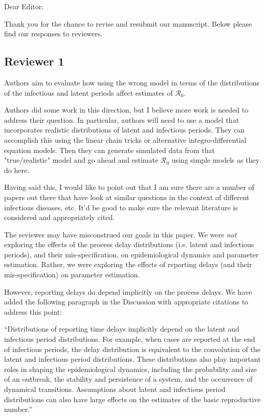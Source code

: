 \documentclass[12pt]{article}
\newcommand{\rev}{\subsection*}
\newcommand{\revtext}{\textsf}
\begin{document}
\noindent Dear Editor:

Thank you for the chance to revise and resubmit our manuscript. 
Below please find our responses to reviewers.

\rev{Reviewer 1}

\revtext{Authors aim to evaluate how using the wrong model in terms of the distributions of the infectious and latent periods affect estimates of $\mathcal R_0$.}

\revtext{Authors did some work in this direction, but I believe more work is needed to address their question. In particular, authors will need to use a model that incorporates realistic distributions of latent and infectious periods. They can accomplish this using the linear chain tricks or alternative integro-differential equation models. Then they can generate simulated data from that "true/realistic" model and go ahead and estimate $\mathcal R_0$ using simple models as they do here.}

\revtext{Having said this, I would like to point out that I am sure there are a number of papers out there that have look at similar questions in the context of different infectious diseases, etc. It'd be good to make sure the relevant literature is considered and appropriately cited.}

The reviewer may have misconstrued our goals in this paper. We were \emph{not} exploring the effects of the process delay distributions (i.e. latent and infectious periods), and their mis-specification, on epidemiological dynamics and parameter estimation. Rather, we were exploring the effects of reporting delays (and their mis-specification) on parameter estimation.

However, reporting delays do depend implicitly on the process delays. We have added the following paragraph in the Discussion with appropriate citations to address this point:

``Distributions of reporting time delays implicitly depend on the latent and infectious 
period distributions. For example, when cases are reported
at the end of infectious periods,
the delay distribution is equivalent to the convolution of the latent and
infectious period distributions. These distributions also play important roles in 
shaping the epidemiological dynamics,
including the probability and size of an outbreak, the stability and persistence of a system,
and the  occurrence of dynamical transitions.
Assumptions about latent and infectious period distributions can also have large effects on the estimates of the basic reproductive number.''
\end{document}
